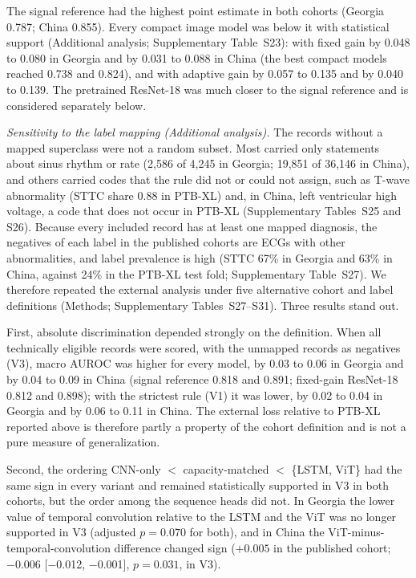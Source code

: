 \documentclass{wlscirep}
\begin{document}
The signal reference had the highest point estimate in both cohorts (Georgia 0.787; China 0.855). Every compact image model was below it with statistical support (Additional analysis; Supplementary Table~S23): with fixed gain by 0.048 to 0.080 in Georgia and by 0.031 to 0.088 in China (the best compact models reached 0.738 and 0.824), and with adaptive gain by 0.057 to 0.135 and by 0.040 to 0.139. The pretrained ResNet-18 was much closer to the signal reference and is considered separately below.

\emph{Sensitivity to the label mapping (Additional analysis).} The records without a mapped superclass were not a random subset. Most carried only statements about sinus rhythm or rate (2{,}586 of 4{,}245 in Georgia; 19{,}851 of 36{,}146 in China), and others carried codes that the rule did not or could not assign, such as T-wave abnormality (STTC share 0.88 in PTB-XL) and, in China, left ventricular high voltage, a code that does not occur in PTB-XL (Supplementary Tables~S25 and S26). Because every included record has at least one mapped diagnosis, the negatives of each label in the published cohorts are ECGs with other abnormalities, and label prevalence is high (STTC 67\% in Georgia and 63\% in China, against 24\% in the PTB-XL test fold; Supplementary Table~S27). We therefore repeated the external analysis under five alternative cohort and label definitions (Methods; Supplementary Tables~S27--S31). Three results stand out.

First, absolute discrimination depended strongly on the definition. When all technically eligible records were scored, with the unmapped records as negatives (V3), macro AUROC was higher for every model, by 0.03 to 0.06 in Georgia and by 0.04 to 0.09 in China (signal reference 0.818 and 0.891; fixed-gain ResNet-18 0.812 and 0.898); with the strictest rule (V1) it was lower, by 0.02 to 0.04 in Georgia and by 0.06 to 0.11 in China. The external loss relative to PTB-XL reported above is therefore partly a property of the cohort definition and is not a pure measure of generalization.

Second, the ordering CNN-only $<$ capacity-matched $<$ \{LSTM, ViT\} had the same sign in every variant and remained statistically supported in V3 in both cohorts, but the order among the sequence heads did not. In Georgia the lower value of temporal convolution relative to the LSTM and the ViT was no longer supported in V3 (adjusted $p=0.070$ for both), and in China the ViT-minus-temporal-convolution difference changed sign ($+0.005$ in the published cohort; $-0.006$ [$-$0.012, $-$0.001], $p=0.031$, in V3).
\end{document}
